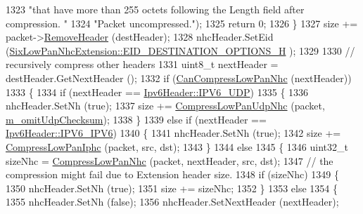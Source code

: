 \begin{DoxyCode}
1323                         \textcolor{stringliteral}{"that have more than 255 octets following the Length field after compression. "}
1324                         \textcolor{stringliteral}{"Packet uncompressed."});
1325           \textcolor{keywordflow}{return} 0;
1326         \}
1327       size += packet->\hyperlink{classns3_1_1Packet_a0961eccf975d75f902d40956c93ba63e}{RemoveHeader} (destHeader);
1328       nhcHeader.SetEid (\hyperlink{classns3_1_1SixLowPanNhcExtension_ac692a22abe80c30bcbafa57ef36bf5ada874ee6f734081d5152bc6bf4ac1737c7}{SixLowPanNhcExtension::EID\_DESTINATION\_OPTIONS\_H}
      );
1329 
1330       \textcolor{comment}{// recursively compress other headers}
1331       uint8\_t nextHeader = destHeader.GetNextHeader ();
1332       \textcolor{keywordflow}{if} (\hyperlink{classns3_1_1SixLowPanNetDevice_a44cfa681aaac7a83c160e9cdfc90d7e0}{CanCompressLowPanNhc} (nextHeader))
1333         \{
1334           \textcolor{keywordflow}{if} (nextHeader == \hyperlink{classns3_1_1Ipv6Header_a226429221a066c5e3b1f260caf27d1e9aef42146d6b211521c22f827b04530253}{Ipv6Header::IPV6\_UDP})
1335             \{
1336               nhcHeader.SetNh (\textcolor{keyword}{true});
1337               size += \hyperlink{classns3_1_1SixLowPanNetDevice_aa163cb1c6e2c82e208692f9bae9b5189}{CompressLowPanUdpNhc} (packet, 
      \hyperlink{classns3_1_1SixLowPanNetDevice_aa3503adbbb86b19e4ec2d17f3c8436f7}{m\_omitUdpChecksum});
1338             \}
1339           \textcolor{keywordflow}{else} \textcolor{keywordflow}{if} (nextHeader == \hyperlink{classns3_1_1Ipv6Header_a226429221a066c5e3b1f260caf27d1e9a2438a09074916d0e066627b28543ec7a}{Ipv6Header::IPV6\_IPV6})
1340             \{
1341               nhcHeader.SetNh (\textcolor{keyword}{true});
1342               size += \hyperlink{classns3_1_1SixLowPanNetDevice_a67bf1501ba018d90c5bdb442371a3722}{CompressLowPanIphc} (packet, src, dst);
1343             \}
1344           \textcolor{keywordflow}{else}
1345             \{
1346               uint32\_t sizeNhc = \hyperlink{classns3_1_1SixLowPanNetDevice_a41d34fd1612e7e6911614fadfef6ab67}{CompressLowPanNhc} (packet, nextHeader, src, dst);
1347               \textcolor{comment}{// the compression might fail due to Extension header size.}
1348               \textcolor{keywordflow}{if} (sizeNhc)
1349                 \{
1350                   nhcHeader.SetNh (\textcolor{keyword}{true});
1351                   size += sizeNhc;
1352                 \}
1353               \textcolor{keywordflow}{else}
1354                 \{
1355                   nhcHeader.SetNh (\textcolor{keyword}{false});
1356                   nhcHeader.SetNextHeader (nextHeader);

\end{DoxyCode}
